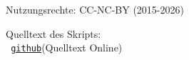 {\begin{center}
\begin{small}
Nutzungsrechte: CC-NC-BY (2015-2026)

\end{small}%
\end{center}


Quelltext des Skripts:\\
{\small \texttt{
\href{https://github.com/pheek/bbwMathe/tree/main/arbeitsblaetter/GESO_Kompendium}{github}}(Quelltext Online)}


\newpage


\tableofcontents{}
\newpage
\pagestyle{fancy}
}%
